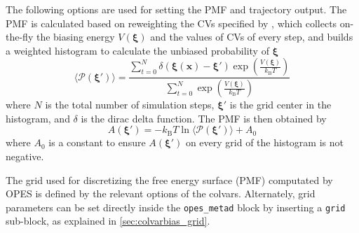 The following options are used for setting the PMF and trajectory output. The PMF is calculated based on reweighting the CVs specified by , which collects on-the-fly the biasing energy $V(\boldsymbol{\xi})$ and the values of CVs of every step, and builds a weighted histogram to calculate the unbiased probability of $\boldsymbol{\xi}$
\begin{equation}
\langle \mathcal{P}\left(\boldsymbol{\xi}'\right) \rangle = \dfrac{\sum_{t=0}^N \delta\left(\boldsymbol{\xi}\left(\mathbf{x}\right)-\boldsymbol{\xi}'\right) \exp\left(\frac{V(\boldsymbol{\xi})}{k_{\mathrm{B}} T}\right)}{\sum_{t=0}^N \exp\left(\frac{V(\boldsymbol{\xi})}{k_{\mathrm{B}} T}\right)}
\end{equation}
where $N$ is the total number of simulation steps, $\boldsymbol{\xi}'$ is the grid center in the histogram, and $\delta$ is the dirac delta function. The PMF is then obtained by
\begin{equation}
A(\boldsymbol{\xi}')=-k_{\mathrm{B}} T \ln{\langle \mathcal{P}(\boldsymbol{\xi}') \rangle} + A_0
\end{equation}
where $A_0$ is a constant to ensure $A(\boldsymbol{\xi}')$ on every grid of the histogram is not negative.

The grid used for discretizing the free energy surface (PMF) computated by OPES is defined by the relevant options of the colvars.
Alternately, grid parameters can be set directly inside the \texttt{opes\_metad} block by inserting a \texttt{grid} sub-block, as explained in \ref{sec:colvarbias_grid}.

